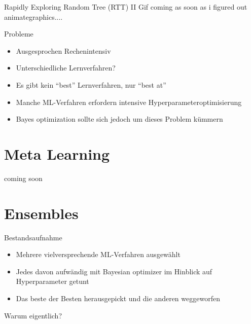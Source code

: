 \documentclass{beamer}
\begin{document}
	\begin{frame}{Rapidly Exploring Random Tree (RTT) II}
		Gif coming as soon as i figured out animategraphics....
	\end{frame}
	
	\begin{frame}{Probleme}
		\begin{itemize}
			\item Ausgesprochen Rechenintensiv
			\item Unterschiedliche Lernverfahren?
			\item Es gibt kein ``best'' Lernverfahren, nur ``best at''
			\item Manche ML-Verfahren erfordern intensive Hyperparameteroptimisierung
			\item Bayes optimization sollte sich jedoch um dieses Problem kümmern
		\end{itemize}
	\end{frame}
	
	\section{Meta Learning}%
	
	\begin{frame}{}
		coming soon
	\end{frame}
	
	
	\section{Ensembles}%
	
	\begin{frame}{Bestandsaufnahme}
		\begin{itemize}
			\item Mehrere vielversprechende ML-Verfahren ausgewählt
			\item Jedes davon aufwändig mit Bayesian optimizer im Hinblick auf Hyperparameter getunt
			\item Das beste der Besten herausgepickt und die anderen weggeworfen
		\end{itemize}
		\pause
		\alert{\LARGE{Warum eigentlich?}}
	\end{frame}
	
\end{document}
